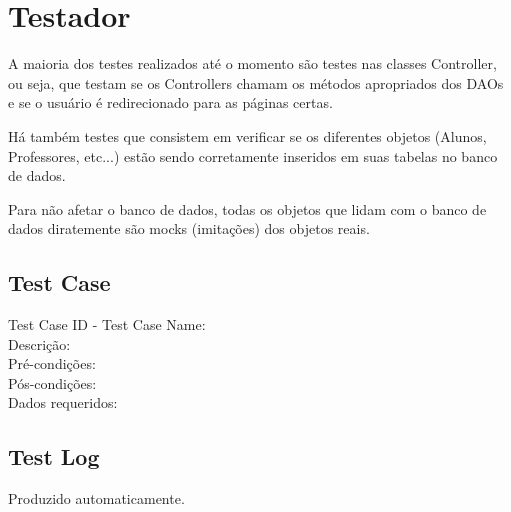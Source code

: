 \documentclass[12pt,letterpaper]{article}
\begin{document}
\pagebreak
\section{Testador}

A maioria dos testes realizados até o momento são testes nas classes Controller, ou seja, que testam se os Controllers chamam os métodos apropriados dos DAOs e se o usuário é redirecionado para as páginas certas. 

Há também testes que consistem em verificar se os diferentes objetos (Alunos, Professores, etc...) estão sendo corretamente inseridos em suas tabelas no banco de dados.

Para não afetar o banco de dados, todas os objetos que lidam com o banco de dados diratemente são mocks (imitações) dos objetos reais.

\subsection{Test Case}


\noindent Test Case ID - Test Case Name:\\
Descrição:\\ %
Pré-condições:\\ %
Pós-condições:\\ %
Dados requeridos:\\ %


\pagebreak
\subsection{Test Log}

Produzido automaticamente. %





%
\end{document}
